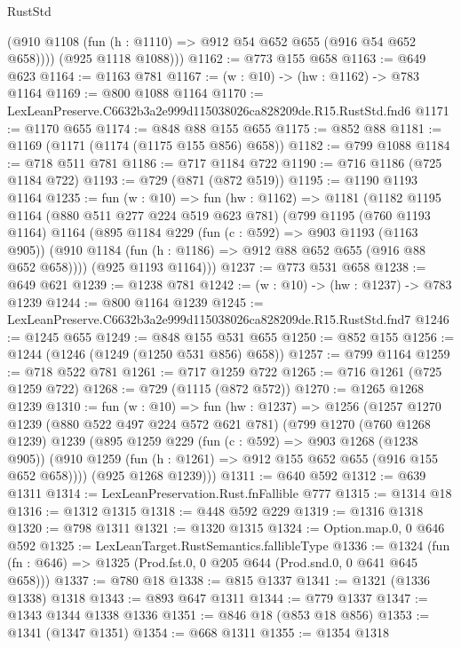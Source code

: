 \begin{lexlean}{RustStd}
\begin{coremodule}
          (@910 @1108 (fun (h : @1110) => @912 @54 @652 @655 (@916 @54 @652 @658))))
        (@925 @1118 @1088)))
@1162 := @773 @155 @658
@1163 := @649 @623
@1164 := @1163 @781
@1167 := (w : @10) -> (hw : @1162) -> @783 @1164
@1169 := @800 @1088 @1164
@1170 := LexLeanPreserve.C6632b3a2e999d115038026ca828209de.R15.RustStd.fnd6
@1171 := @1170 @655
@1174 := @848 @88 @155 @655
@1175 := @852 @88
@1181 := @1169 (@1171 (@1174 (@1175 @155 @856) @658))
@1182 := @799 @1088
@1184 := @718 @511 @781
@1186 := @717 @1184 @722
@1190 := @716 @1186 (@725 @1184 @722)
@1193 := @729 (@871 (@872 @519))
@1195 := @1190 @1193 @1164
@1235 := fun (w : @10) =>
  fun (hw : @1162) =>
  @1181
    (@1182
      @1195
      @1164
      (@880 @511 @277 @224 @519 @623 @781)
      (@799
        @1195
        (@760 @1193 @1164)
        @1164
        (@895
          @1184
          @229
          (fun (c : @592) => @903 @1193 (@1163 @905))
          (@910 @1184 (fun (h : @1186) => @912 @88 @652 @655 (@916 @88 @652 @658))))
        (@925 @1193 @1164)))
@1237 := @773 @531 @658
@1238 := @649 @621
@1239 := @1238 @781
@1242 := (w : @10) -> (hw : @1237) -> @783 @1239
@1244 := @800 @1164 @1239
@1245 := LexLeanPreserve.C6632b3a2e999d115038026ca828209de.R15.RustStd.fnd7
@1246 := @1245 @655
@1249 := @848 @155 @531 @655
@1250 := @852 @155
@1256 := @1244 (@1246 (@1249 (@1250 @531 @856) @658))
@1257 := @799 @1164
@1259 := @718 @522 @781
@1261 := @717 @1259 @722
@1265 := @716 @1261 (@725 @1259 @722)
@1268 := @729 (@1115 (@872 @572))
@1270 := @1265 @1268 @1239
@1310 := fun (w : @10) =>
  fun (hw : @1237) =>
  @1256
    (@1257
      @1270
      @1239
      (@880 @522 @497 @224 @572 @621 @781)
      (@799
        @1270
        (@760 @1268 @1239)
        @1239
        (@895
          @1259
          @229
          (fun (c : @592) => @903 @1268 (@1238 @905))
          (@910 @1259 (fun (h : @1261) => @912 @155 @652 @655 (@916 @155 @652 @658))))
        (@925 @1268 @1239)))
@1311 := @640 @592
@1312 := @639 @1311
@1314 := LexLeanPreservation.Rust.fnFallible @777
@1315 := @1314 @18
@1316 := @1312 @1315
@1318 := @448 @592 @229
@1319 := @1316 @1318
@1320 := @798 @1311
@1321 := @1320 @1315
@1324 := Option.map.{0, 0} @646 @592
@1325 := LexLeanTarget.RustSemantics.fallibleType
@1336 := @1324
    (fun (fn : @646) => @1325 (Prod.fst.{0, 0} @205 @644 (Prod.snd.{0, 0} @641 @645 @658)))
@1337 := @780 @18
@1338 := @815 @1337
@1341 := @1321 (@1336 @1338) @1318
@1343 := @893 @647 @1311
@1344 := @779 @1337
@1347 := @1343 @1344 @1338 @1336
@1351 := @846 @18 (@853 @18 @856)
@1353 := @1341 (@1347 @1351)
@1354 := @668 @1311
@1355 := @1354 @1318

\end{coremodule}
\end{lexlean}
